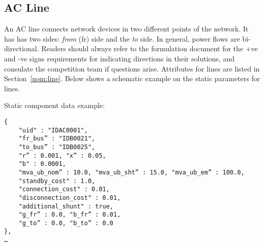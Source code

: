 \subsection{AC Line}
\label{sec:acline}
An AC line connects network devices in two different points of the network. 
It has has two sides: \emph{from} (fr) side and the \emph{to} side.
In general, power flows are bi-directional. 
Readers should always refer to the formulation document for the +ve and -ve signs
requirements for indicating directions in their solutions,
and consulate the competition team if questions arise.
Attributes for lines are listed in Section~\ref{nom:line}.
Below shows a schematic example on the static parameters for lines.

Static component data example:
\begin{verbatim}
{
    "uid" : "IDAC0001",
    "fr_bus” : "IDB0021",
    "to_bus” : "IDB0025",
    "r” : 0.001, "x” : 0.05, 
    "b" : 0.0001,
    "mva_ub_nom” : 10.0, "mva_ub_sht” : 15.0, "mva_ub_em” : 100.0,
    "standby_cost" : 1.0,
    "connection_cost" : 0.01,
    "disconnection_cost" : 0.01,
    "additional_shunt" : true,
    "g_fr” : 0.0, "b_fr” : 0.01,
    "g_to” : 0.0, "b_to” : 0.0    
},
…     
\end{verbatim}


